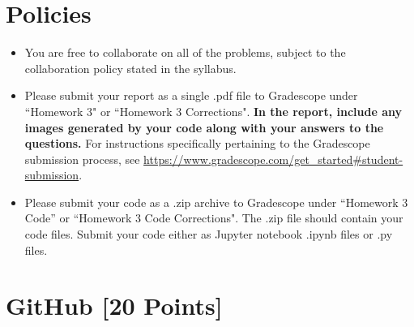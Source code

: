 \newif\ifshowsolutions
\showsolutionsfalse




\pagestyle{fancy}

\section*{Policies}
\begin{itemize}
	\item You are free to collaborate on all of the problems, subject to the collaboration policy stated in the syllabus.
	\item Please submit your report as a single .pdf file to Gradescope under ``Homework 3" or ``Homework 3 Corrections".
	      \textbf{In the report, include any images generated by your code along with your answers to the questions.}
	      For instructions specifically pertaining to the Gradescope submission process, see \url{https://www.gradescope.com/get_started#student-submission}.
	\item Please submit your code as a .zip archive to Gradescope under ``Homework 3 Code'' or ``Homework 3 Code Corrections".
	      The .zip file should contain your code files.
	      Submit your code either as Jupyter notebook .ipynb files or .py files.
\end{itemize}

\newpage
\section{GitHub [20 Points]}

